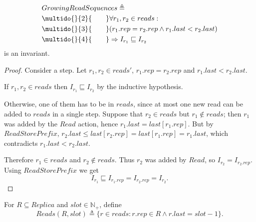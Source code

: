 \documentclass[12pt,a4paper,en]{pracamgr}
\newcommand{\mbb}[1]{\mathbb{#1}}
\newcommand{\ind}[1]{\multido{}{#1}{\qquad}}
\begin{document}
\begin{lemma}
    \begin{align*}
        & GrowingReadSequences \triangleq\\
        & \ind{2} \forall r_1, r_2 \in reads:\\
        & \ind{3} (r_1.rep = r_2.rep \land r_1.last < r_2.last)\\
        & \ind{4} \Rightarrow I_{r_1} \sqsubseteq I_{r_2}
    \end{align*}
    is an invariant.
\end{lemma}
\begin{proof}
    Consider a step. Let $r_1, r_2 \in reads'$, $r_1.rep = r_2.rep$ and $r_1.last < r_2.last$.

    If $r_1, r_2 \in reads$ then $I_{r_1} \sqsubseteq I_{r_2}$ by the inductive hypothesis.

    Otherwise, one of them has to be in $reads$, since at most one new read can be added to $reads$ in a single step. Suppose that $r_2 \in reads$ but $r_1 \notin reads$; then $r_1$ was added by the $Read$ action, hence $r_1.last = last[r_1.rep]$. But by $ReadStorePrefix$, $r_2.last \le last[r_2.rep] = last[r_1.rep] = r_1.last$, which contradicts $r_1.last < r_2.last$.

    Therefore $r_1 \in reads$ and $r_2 \notin reads$. Thus $r_2$ was added by $Read$, so $I_{r_2} = I_{r_2.rep}$. Using $ReadStorePrefix$ we get
    $$ I_{r_1} \sqsubseteq I_{r_1.rep} = I_{r_2.rep} = I_{r_2}. $$
\end{proof}

For $R \subseteq Replica$ and $slot \in \mbb N_+$, define
$$ Reads(R, slot) \triangleq \{r \in reads: r.rep \in R \land r.last = slot - 1\}. $$
\end{document}
